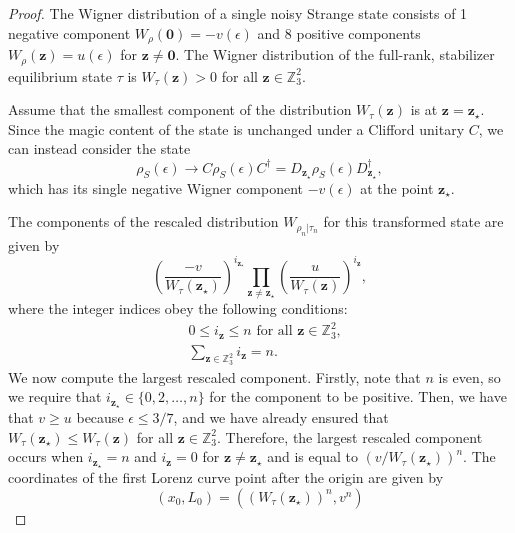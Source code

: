 \documentclass[
twocolumn,
superscriptaddress
]{revtex4-1}
\def\bmo{\bm{0}}
\def\z{\boldsymbol{z}}
\begin{document}
\begin{proof}
The Wigner distribution of a single noisy Strange state consists of 1 negative component $W_{\rho}(\mathbf{0}) = -v(\epsilon)$ and 8 positive components $W_{\rho}(\z) = u(\epsilon)$ for $\z \neq \bmo$.
The Wigner distribution of the full-rank, stabilizer equilibrium state $\tau$ is $W_{\tau}(\z) > 0$ for all $\z \in \mathbb{Z}_3^2$.

Assume that the smallest component of the distribution $W_\tau(\z)$ is at $\z=\z_\star$. Since the magic content of the state is unchanged under a Clifford unitary $C$, we can instead consider the state
\begin{equation}
\rho_S(\epsilon) \rightarrow C \rho_S(\epsilon) C^\dagger = D_{\z_\star} \rho_S(\epsilon) D_{\z_\star}^\dagger,
\end{equation}
which has its single negative Wigner component $-v(\epsilon)$ at the point $\z_\star$.

The components of the rescaled distribution $W_{\rho_n|\tau_n}$ for this transformed state are given by
\begin{equation}
	\left(\frac{-v}{W_{\tau}(\z_\star)}\right)^{i_{\z_\star}} \prod_{\z \neq \z_\star} \left(\frac{u}{W_{\tau}(\z)}\right)^{i_{\z}},
\end{equation}
where the integer indices obey the following conditions:
\begin{align}
&0 \leq i_{\z} \leq n \mbox{ for all } \z \in \mathbb{Z}_3^2, \nonumber \\
&\sum_{\z \in \mathbb{Z}_3^2} i_{\z} = n.
\end{align}
We now compute the largest rescaled component.
Firstly, note that $n$ is even, so we require that $i_{\z_\star} \in \{0,2,\dots,n\}$ for the component to be positive.
Then, we have that $v \geq u$ because $\epsilon \leq 3/7$, and we have already ensured that $W_{\tau}(\z_\star) \leq W_{\tau}(\z)$ for all $\z \in \mathbb{Z}_3^2$.
Therefore, the largest rescaled component occurs when $i_{\z_{\star}} = n$ and $i_{\z} = 0$ for $\z \neq \z_\star$ and is equal to $(v/W_{\tau}(\z_\star))^n$.
The coordinates of the first Lorenz curve point after the origin are given by
\begin{equation}
	(x_0, L_0) = ((W_{\tau}(\z_\star))^n, v^n)
\end{equation}


\end{proof}
\end{document}

